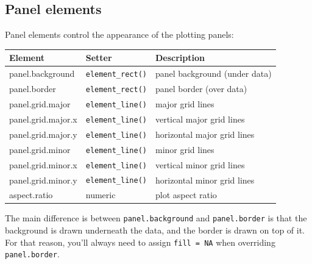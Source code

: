 \subsection{Panel elements}

 

Panel elements control the appearance of the plotting panels:

\begin{longtable}[c]{@{}lll@{}}
\toprule
Element & Setter & Description\tabularnewline
\midrule
\endhead
panel.background & \texttt{element\_rect()} & panel background (under
data)\tabularnewline
panel.border & \texttt{element\_rect()} & panel border (over
data)\tabularnewline
panel.grid.major & \texttt{element\_line()} & major grid
lines\tabularnewline
panel.grid.major.x & \texttt{element\_line()} & vertical major grid
lines\tabularnewline
panel.grid.major.y & \texttt{element\_line()} & horizontal major grid
lines\tabularnewline
panel.grid.minor & \texttt{element\_line()} & minor grid
lines\tabularnewline
panel.grid.minor.x & \texttt{element\_line()} & vertical minor grid
lines\tabularnewline
panel.grid.minor.y & \texttt{element\_line()} & horizontal minor grid
lines\tabularnewline
aspect.ratio & numeric & plot aspect ratio\tabularnewline
\bottomrule
\end{longtable}

The main difference is between \texttt{panel.background} and
\texttt{panel.border} is that the background is drawn underneath the
data, and the border is drawn on top of it. For that reason, you'll
always need to assign \texttt{fill\ =\ NA} when overriding
\texttt{panel.border}.

\begin{Shaded}
\begin{Highlighting}[]
\StringTok{ }\StringTok{ }\NormalTok{()}
\StringTok{ }\NormalTok{(} \NormalTok{(} \NormalTok{))}

\StringTok{ }\NormalTok{(}
   \NormalTok{(} \NormalTok{, } \NormalTok{)}
\NormalTok{)}
\StringTok{ }\NormalTok{(}
   \NormalTok{(} \NormalTok{, } \NormalTok{)}
\NormalTok{)}
\end{Highlighting}
\end{Shaded}

